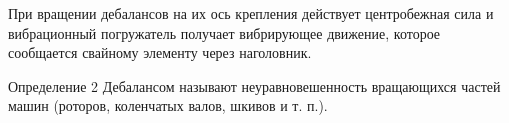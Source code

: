 \documentclass[10pt, pdf, hyperref={unicode}]{beamer}
\begin{document}
\begin{frame}
\begin{minipage}[h]{0.4\linewidth}
                \end{minipage}
    \end{frame}


    \begin{frame}
        При вращении дебалансов на их ось крепления действует центробежная сила и вибрационный погружатель получает вибрирующее движение,
        которое сообщается свайному элементу через наголовник.
        
        \begin{block}{Определение 2}
            Дебалансом называют неуравновешенность вращающихся частей машин (роторов, коленчатых валов, шкивов и т. п.).
        \end{block}
        
    \end{frame}
\end{document}
